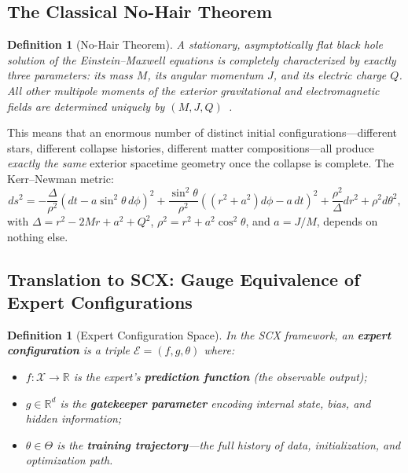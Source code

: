 \documentclass[12pt,a4paper]{article}
\newtheorem{definition}[theorem]{Definition}
\theoremstyle{remark}
\newcommand{\R}{\mathbb{R}}
\newcommand{\X}{\mathcal{X}}
\newcommand{\SCX}{\textsf{SCX}}
\begin{document}
\subsection{The Classical No-Hair Theorem}

\begin{definition}[No-Hair Theorem]
\label{def:nohair}
A stationary, asymptotically flat black hole solution of the Einstein--Maxwell equations is completely characterized by exactly three parameters: its mass $M$, its angular momentum $J$, and its electric charge $Q$. All other multipole moments of the exterior gravitational and electromagnetic fields are determined uniquely by $(M, J, Q)$~\cite{israel1967event,carter1971axisymmetric,robinson1975uniqueness}.
\end{definition}

This means that an enormous number of distinct initial configurations---different stars, different collapse histories, different matter compositions---all produce \emph{exactly the same} exterior spacetime geometry once the collapse is complete. The Kerr--Newman metric:
\begin{equation}
  \label{eq:kerr_newman}
  ds^2 = -\frac{\Delta}{\rho^2}(dt - a\sin^2\theta\,d\phi)^2
  + \frac{\sin^2\theta}{\rho^2}((r^2 + a^2)d\phi - a\,dt)^2
  + \frac{\rho^2}{\Delta}dr^2 + \rho^2 d\theta^2,
\end{equation}
with $\Delta = r^2 - 2Mr + a^2 + Q^2$, $\rho^2 = r^2 + a^2\cos^2\theta$, and $a = J/M$, depends on nothing else.

\subsection{Translation to SCX: Gauge Equivalence of Expert Configurations}

\begin{definition}[Expert Configuration Space]
\label{def:expert_config}
In the \SCX{} framework, an \textbf{expert configuration} is a triple $\mathcal{E} = (f, g, \theta)$ where:
\begin{itemize}[leftmargin=*]
  \item $f: \X \to \R$ is the expert's \textbf{prediction function} (the observable output);
  \item $g \in \R^d$ is the \textbf{gatekeeper parameter} encoding internal state, bias, and hidden information;
  \item $\theta \in \Theta$ is the \textbf{training trajectory}---the full history of data, initialization, and optimization path.
\end{itemize}
\end{definition}
\end{document}

